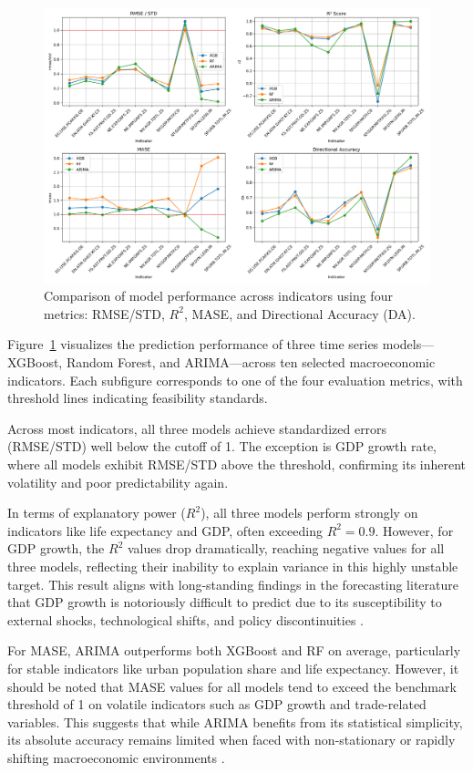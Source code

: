 \documentclass[12pt]{article}
\begin{document}
\begin{figure}[H]
    \centering
    \includegraphics[width=\textwidth]{figure4.png}
    \caption{Comparison of model performance across indicators using four metrics: RMSE/STD, $R^2$, MASE, and Directional Accuracy (DA). }
    \label{fig:indicator_comparison}
\end{figure}

Figure~\ref{fig:indicator_comparison} visualizes the prediction performance of three time series models—XGBoost, Random Forest, and ARIMA—across ten selected macroeconomic indicators. Each subfigure corresponds to one of the four evaluation metrics, with threshold lines indicating feasibility standards.

Across most indicators, all three models achieve standardized errors (RMSE/STD) well below the cutoff of 1. The exception is GDP growth rate, where all models exhibit RMSE/STD above the threshold, confirming its inherent volatility and poor predictability again.

In terms of explanatory power ($R^2$), all three 
models perform strongly on indicators like life expectancy and GDP, often exceeding $R^2 = 0.9$. 
However, for GDP growth, the $R^2$ values drop dramatically, reaching negative values for all three models, reflecting their inability to explain variance in this highly unstable target. This result aligns with long-standing findings in the forecasting literature that GDP growth is notoriously difficult to predict due to its susceptibility to external shocks, technological shifts, and policy discontinuities \cite{Loungani2001, ClementsHendry2002}.

For MASE, ARIMA outperforms both XGBoost and RF on average, particularly for stable indicators like urban population share and life expectancy. However, it should be noted that MASE values for all models tend to exceed the benchmark threshold of 1 on volatile indicators such as GDP growth and trade-related variables. This suggests that while ARIMA benefits from its statistical simplicity, its absolute accuracy remains limited when faced with non-stationary or rapidly shifting macroeconomic environments \cite{Hyndman2006}.
\end{document}
